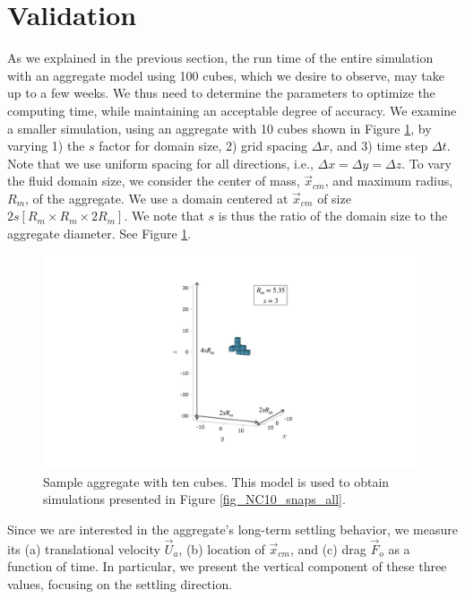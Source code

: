 \section{Validation}
\label{sec:ch3_validation}
As we explained in the previous section, the run time of the entire simulation with an aggregate model using 100 cubes, which we desire to observe, may take up to a few weeks. We thus need to determine the parameters to optimize the computing time, while maintaining an acceptable degree of accuracy. We examine a smaller simulation, using an aggregate with 10 cubes shown in Figure \ref{fig_sample_agg10}, by varying 1) the $s$ factor for domain size, 2) grid spacing $\Delta x$, and 3) time step  $\Delta t$. Note that we use uniform spacing for all directions, i.e., $\Delta x = \Delta y = \Delta z$. To vary the fluid domain size, we consider the center of mass,  $\vec{x}_{cm}$, and maximum radius, $R_m$, of the aggregate.
We use a domain centered at $\vec{x}_{cm}$ of size  $2s\left[  R_m \times   R_m \times 2 R_m \right]$. We note that $s$ is thus the ratio of the domain size to the aggregate diameter. See Figure \ref{fig_sample_agg10}.
\begin{figure}[ht]
	\begin{center}
		\includegraphics[scale=0.4]{./figures/fig_sample_agg10.pdf}
		\caption{Sample aggregate with ten cubes. This model is used to obtain simulations presented in Figure \ref{fig_NC10_snaps_all}.}
		\label{fig_sample_agg10}
	\end{center}
\end{figure}
\par
Since we are interested in the aggregate's long-term settling behavior, we measure its (a) translational velocity $\vec{U}_a$, (b) location of $\vec{x}_{cm}$, and (c) drag $\vec{F}_o$ as a function of time. 
In particular, we present the vertical component of these three values, focusing on the settling direction.
